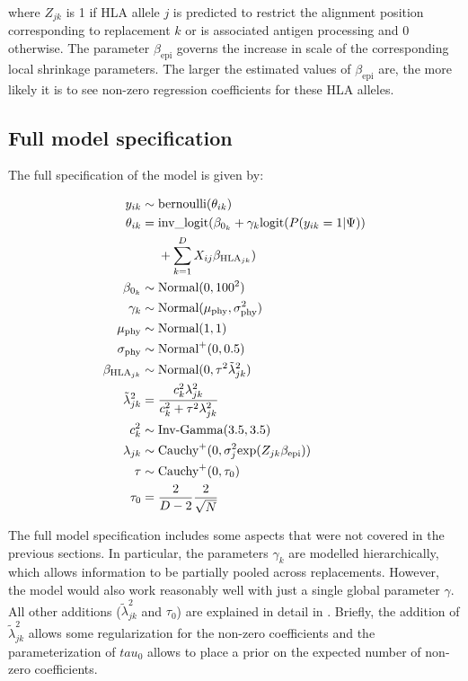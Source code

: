 \documentclass[fleqn,11pt]{SelfArx} %
\begin{document}
where \(Z_{jk}\) is 1 if HLA allele \(j\) is predicted to restrict the alignment position corresponding to replacement \(k\) or is associated antigen processing and 0 otherwise.
The parameter \(\beta_{\text{epi}}\) governs the increase in scale of the  corresponding local shrinkage parameters. The larger the estimated values of \(\beta_{\text{epi}}\) are, the more likely it is to see non-zero regression coefficients for these HLA alleles.

\subsection*{Full model specification}

The full specification of the model is given by:

\begin{equation}
  \label{eq:full}
  \begin{aligned}
    y_{ik} &\sim \text{bernoulli}(\theta_{ik})\\
      \theta_{ik} &=
        \text{inv\_logit}(\beta_{0_{k}} + \gamma_{k}\text{logit}(P(y_{ik}=1|\Psi))\\
        \hspace{-6cm} &~~~~ +\sum_{k=1}^{D}X_{ij}\beta_{\text{HLA}_{jk}}) \\
    \beta_{0_{k}} &\sim \text{Normal}(0, 100^2)\\
    \gamma_{k} &\sim \text{Normal}(\mu_{\text{phy}}, \sigma_{\text{phy}}^2)\\
    \mu_{\text{phy}} &\sim \text{Normal}(1, 1)\\
    \sigma_{\text{phy}} &\sim \text{Normal}^{+}(0, 0.5)\\
    \beta_{\text{HLA}_{jk}} &\sim \text{Normal}(0, \tau^{2}\tilde{\lambda}^{2}_{jk})\\
    \tilde{\lambda}^{2}_{jk} &= \frac{c_{k}^{2}\lambda_{jk}^{2}}{c_{k}^{2} + \tau^{2}\lambda_{jk}^{2}} \\
    c_{k}^2 &\sim \text{Inv-Gamma}(3.5, 3.5)\\
    \lambda_{jk} &\sim \text{Cauchy}^{+}(0, \sigma_{j}^2\text{exp}(Z_{jk}\beta_{\text{epi}}))\\
    \tau &\sim \text{Cauchy}^{+}(0, \tau_{0})\\
    \tau_{0} &= \frac{2}{D-2}\frac{2}{\sqrt{N}}\\
  \end{aligned}
\end{equation}

The full model specification includes some aspects that were not covered in the previous sections. In particular, the parameters \(\gamma_{k}\) are modelled hierarchically, which allows information to be partially pooled across replacements. However, the model would also work reasonably well with just a single global parameter \(\gamma\). All other additions (\(\tilde{\lambda}_{jk}^{2}\) and \(\tau_0\)) are explained in detail in \cite{Piironen2017}. Briefly, the addition of  \(\tilde{\lambda}_{jk}^{2}\) allows some regularization for the non-zero coefficients and the parameterization of \(tau_{0}\) allows to place a prior on the expected number of non-zero coefficients.
\end{document}
